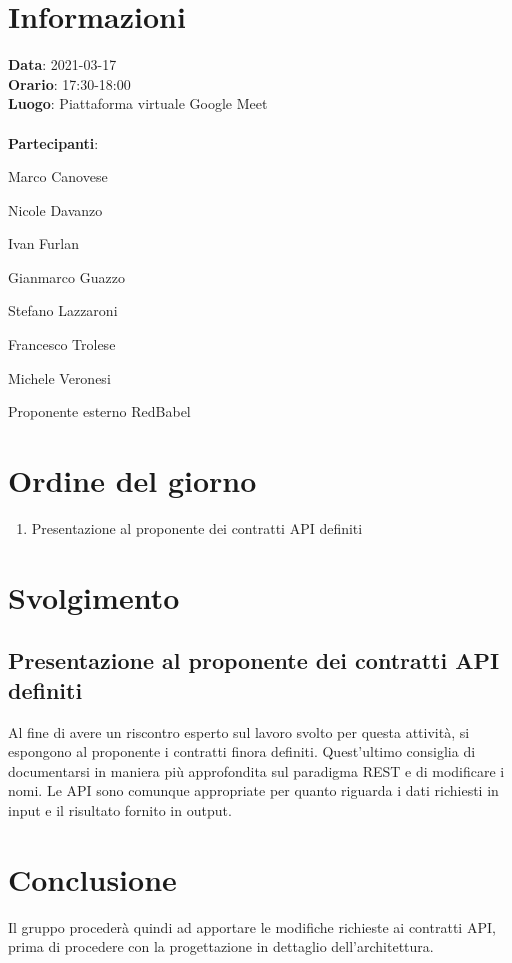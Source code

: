 \section{Informazioni}
\textbf{Data}: 2021-03-17 \\
\textbf{Orario}: 17:30-18:00 \\
\textbf{Luogo}: Piattaforma virtuale Google Meet \\\\
\textbf{Partecipanti}:\begin{list}{*}{\setlength{\itemsep}{0cm}}
	\item Marco Canovese
	\item Nicole Davanzo
	\item Ivan Furlan
	\item Gianmarco Guazzo
	\item Stefano Lazzaroni
	\item Francesco Trolese
	\item Michele Veronesi
	\item Proponente esterno RedBabel
\end{list}

\section{Ordine del giorno}
\begin{enumerate}
	\item Presentazione al proponente dei contratti API definiti
\end{enumerate}

\section{Svolgimento}
\subsection{Presentazione al proponente dei contratti API definiti}
Al fine di avere un riscontro esperto sul lavoro svolto per questa attività, si espongono al proponente i contratti finora definiti.
Quest'ultimo consiglia di documentarsi in maniera più approfondita sul paradigma REST e di modificare i nomi. Le API sono comunque appropriate
per quanto riguarda i dati richiesti in input e il risultato fornito in output.


\section{Conclusione}
Il gruppo procederà quindi ad apportare le modifiche richieste ai contratti API, prima di procedere con la progettazione in dettaglio dell'architettura.